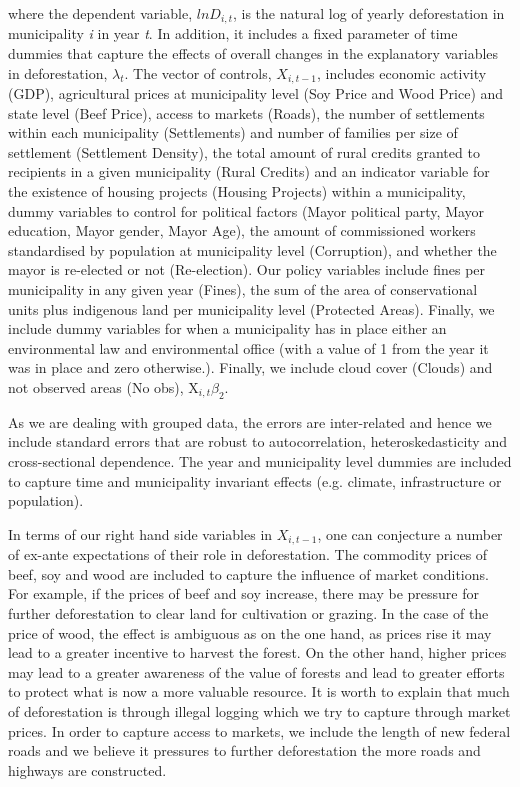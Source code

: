 where the dependent variable, $lnD_{i,t}$, is the natural log of yearly deforestation in municipality \textit{i} in year \textit{t}. In addition, it includes a fixed parameter of time dummies that capture the effects of overall changes in the explanatory variables in deforestation, $\lambda_{t}$. The vector of controls, $X_{i,t-1}$, includes economic activity (GDP), agricultural prices at municipality level (Soy Price and Wood Price) and state level (Beef Price), access to markets (Roads), the number of settlements within each municipality (Settlements) and number of families per size of settlement (Settlement Density), the total amount of rural credits granted to recipients in a given municipality (Rural Credits) and an indicator variable for the existence of housing projects (Housing Projects) within a municipality, dummy variables to control for political factors (Mayor political party, Mayor education, Mayor gender, Mayor Age), the amount of commissioned workers standardised by population at municipality level (Corruption), and whether the mayor is re-elected or not (Re-election). Our policy variables include fines per municipality in any given year (Fines), the sum of the area of conservational units plus indigenous land per municipality level (Protected Areas). Finally, we include dummy variables for when a municipality has in place either an environmental law and environmental office (with a value of 1 from the year it was in place and zero otherwise.). Finally, we include cloud cover (Clouds) and not observed areas (No obs), $\text{X}_{i,t} \beta_{2}$.

As we are dealing with grouped data, the errors are inter-related and hence we include \citet{DRISCOLL} standard errors that are robust to autocorrelation, heteroskedasticity and cross-sectional dependence. The year and municipality level dummies are included to capture time and municipality invariant effects (e.g. climate, infrastructure or population).

In terms of our right hand side variables in $X_{i,t-1}$, one can conjecture a number of ex-ante expectations of their role in deforestation.  The commodity prices of beef, soy and wood are included to capture the influence of market conditions. For example, if the prices of beef and soy increase, there may be pressure for further deforestation to clear land for cultivation or grazing.  In the case of the price of wood, the effect is ambiguous as on the one hand, as prices rise it may lead to a greater incentive to harvest the forest.  On the other hand, higher prices may lead to a greater awareness of the value of forests and lead to greater efforts to protect what is now a more valuable resource. 
It is worth to explain that much of deforestation is through illegal logging which we try to capture through market prices. In order to capture access to markets, we include the length of new federal roads and we believe it pressures to further deforestation the more roads and highways are constructed.

